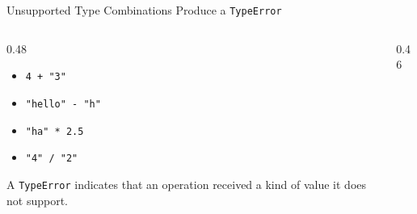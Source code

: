 \documentclass[aspectratio=169,10pt]{beamer}
\begin{document}
\begin{frame}{Unsupported Type Combinations Produce a \texttt{TypeError}}

  \begin{columns}[T,onlytextwidth]

    \begin{column}{0.48\textwidth}

      \begin{itemize}

        \item \texttt{4 + "3"}

        \item \texttt{"hello" - "h"}

        \item \texttt{"ha" * 2.5}

        \item \texttt{"4" / "2"}

      \end{itemize}

      \begin{cpdefinition}

        A \texttt{TypeError} indicates that an operation received a kind of value it does not support.

      \end{cpdefinition}

    \end{column}

    \begin{column}{0.46\textwidth}

    \end{column}

  \end{columns}

\end{frame}

\end{document}
